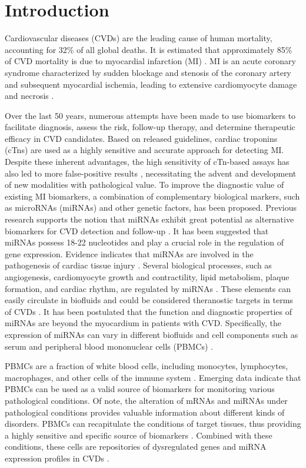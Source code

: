 \documentclass[sn-mathphys,Numbered]{sn-jnl}%
\theoremstyle{thmstyleone}%
\theoremstyle{thmstyletwo}%
\theoremstyle{thmstylethree}%
\begin{document}
\section{Introduction}\label{introduction}

Cardiovascular diseases (CVDs) are the leading cause of human mortality,
accounting for 32\% of all global deaths. It is estimated that
approximately 85\% of CVD mortality is due to myocardial infarction (MI) \cite{CVD}. MI is an acute coronary
syndrome characterized by sudden blockage and stenosis of the coronary
artery and subsequent myocardial ischemia, leading to extensive
cardiomyocyte damage and necrosis \cite{Macro}.

Over the last 50 years, numerous attempts have been made to use
biomarkers to facilitate diagnosis, assess the risk, follow-up therapy,
and determine therapeutic efficacy in CVD candidates. Based on released
guidelines, cardiac troponins (cTns) are used as a highly sensitive and
accurate approach for detecting MI. Despite these inherent advantages,
the high sensitivity of cTn-based assays has also led to more
false-positive results \cite{17}, necessitating the advent
and development of new modalities with pathological value. To improve
the diagnostic value of existing MI biomarkers, a combination of
complementary biological markers, such as microRNAs (miRNAs) and other
genetic factors, has been proposed. Previous research supports the
notion that miRNAs exhibit great potential as alternative biomarkers for
CVD detection and follow-up \cite{miR}. It has been suggested
that miRNAs possess 18-22 nucleotides and play a crucial role in the
regulation of gene expression. Evidence indicates that miRNAs are
involved in the pathogenesis of cardiac tissue injury \cite{m1}. Several biological processes, such as angiogenesis,
cardiomyocyte growth and contractility, lipid metabolism, plaque
formation, and cardiac rhythm, are regulated by miRNAs \cite{m2}. These elements can easily circulate in biofluids and could be
considered theranostic targets in terms of CVDs \cite{m1}. It has been postulated that the function and diagnostic
properties of miRNAs are beyond the myocardium in patients with CVD.
Specifically, the expression of miRNAs can vary in different biofluids
and cell components such as serum and peripheral blood mononuclear cells
(PBMCs) \cite{36}.

PBMCs are a fraction of white blood cells, including monocytes,
lymphocytes, macrophages, and other cells of the immune system \cite{PBMC-miR}. Emerging data indicate that PBMCs can be used as a valid
source of biomarkers for monitoring various pathological conditions. Of
note, the alteration of mRNAs and miRNAs under pathological conditions
provides valuable information about different kinds of disorders. PBMCs
can recapitulate the conditions of target tissues, thus providing a
highly sensitive and specific source of biomarkers \cite{Meder6}. Combined with these conditions, these cells are repositories of
dysregulated genes and miRNA expression profiles in CVDs \cite{PBMC-miR, Meder6}.
\end{document}
